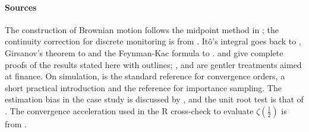 \begin{chapterrefs}
\paragraph{Sources}
The construction of Brownian motion follows the midpoint method in \textcite{morters2010}; the
continuity correction for discrete monitoring is from \textcite{broadie1997}. It\^o's integral goes back to
\textcite{ito1944}, Girsanov's theorem to \textcite{girsanov1960} and the Feynman-Kac formula to
\textcite{kac1949}. \textcite{karatzas1998} and \textcite{oksendal2003} give complete proofs of the
results stated here with outlines; \textcite{steele2001}, \textcite{shreve2004} and \textcite{wilmott2006}
are gentler treatments aimed at finance. On simulation, \textcite{kloeden1992} is the standard reference
for convergence orders, \textcite{higham2001} a short practical introduction and
\textcite{glasserman2003} the reference for importance sampling. The estimation bias in the case study is
discussed by \textcite{kendall1954}, and the unit root test is that of \textcite{dickey1979}. The
convergence acceleration used in the R cross-check to evaluate $\zeta(\tfrac12)$ is from
\textcite{cohen2000}.


\end{chapterrefs}
